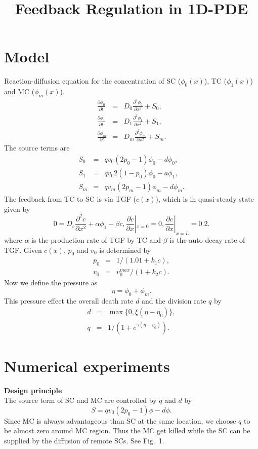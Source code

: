 \documentclass[12pt]{article}
\begin{document}
\title{Feedback Regulation in 1D-PDE}
\maketitle

\section{Model}

Reaction-diffusion equation for the concentration 
of SC ($\phi_0(x)$), TC ($\phi_1(x)$) and MC ($\phi_m(x)$).
\begin{eqnarray*}
\frac{\partial \phi_0}{\partial t} &=&
D_0 \frac{\partial^2 \phi_0}{\partial x^2} + S_0, \\
\frac{\partial \phi_1}{\partial t} &=&
D_1 \frac{\partial^2 \phi_1}{\partial x^2} + S_1, \\
\frac{\partial \phi_m}{\partial t} &=&
D_m \frac{\partial^2 \phi_m}{\partial x^2} + S_m.
\end{eqnarray*}
The source terms are
\begin{eqnarray*}
S_0 &=& q v_0 (2p_0 - 1) \phi_0 - d \phi_0, \\
S_1 &=& q v_0 2(1 - p_0) \phi_0 - a \phi_1, \\
S_m &=& q v_m (2p_m - 1) \phi_m - d \phi_m.
\end{eqnarray*}
The feedback from TC to SC is via TGF ($c(x)$),
which is in quasi-steady state given by
$$
0 = D_c \frac{\partial^2 c}{\partial x^2} + 
\alpha \phi_1 - \beta c, \frac{\partial c}{\partial x}|_{x=0} = 0, 
\frac{\partial c}{\partial x}|_{x=L} = 0.2.
$$
where $\alpha$ is the production rate of TGF by TC and
$\beta$ is the auto-decay rate of TGF.
Given $c(x)$, $p_0$ and $v_0$ is determined by
\begin{eqnarray*}
p_0 &=& 1 / (1.01 + k_1 c), \\
v_0 &=& v_0^{max} / (1 + k_2 c).
\end{eqnarray*}
Now we define the pressure as
$$
\eta = \phi_0 + \phi_m.
$$
This pressure effect the overall death rate $d$ 
and the division rate $q$ by
\begin{eqnarray*}
d &=& \max \{0, \xi (\eta - \eta_0)\}, \\
q &=& 1 / (1 + e^{\gamma (\eta - \eta_0)} ).
\end{eqnarray*}

\section{Numerical experiments}
\noindent\textbf{Design principle}\\
The source term of SC and MC are controlled by $q$ and $d$ by
$$
S = q v_0 (2p_0 - 1) \phi - d \phi.
$$
Since MC is always advantageous than SC at the same location,
we choose $q$ to be almost zero around MC region.
Thus the MC get killed while the SC can be supplied by the 
diffusion of remote SCs. See Fig.~1.
\end{document}
